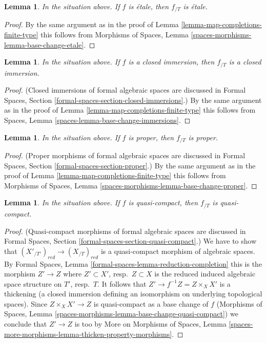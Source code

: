 \documentclass{stacks-project}
\theoremstyle{plain}
\newtheorem{lemma}[subsection]{Lemma}
\theoremstyle{definition}
\theoremstyle{remark}
\numberwithin{equation}{subsection}
\begin{document}
\begin{lemma}
\label{lemma-map-completions-etale}
In the situation above. If $f$ is \'etale, then $f_{/T}$ is \'etale.
\end{lemma}

\begin{proof}
By the same argument as in the proof of
Lemma \ref{lemma-map-completions-finite-type} this follows from
Morphisms of Spaces, Lemma \ref{spaces-morphisms-lemma-base-change-etale}.
\end{proof}

\begin{lemma}
\label{lemma-closed-immersion-gives-closed-immersion}
In the situation above. If $f$ is a closed immersion, then
$f_{/T}$ is a closed immersion.
\end{lemma}

\begin{proof}
(Closed immersions of formal algebraic spaces are discussed in
Formal Spaces, Section
\ref{formal-spaces-section-closed-immersions}.)
By the same argument as in the proof of
Lemma \ref{lemma-map-completions-finite-type} this follows from
Spaces, Lemma
\ref{spaces-lemma-base-change-immersions}.
\end{proof}

\begin{lemma}
\label{lemma-proper-gives-proper}
In the situation above. If $f$ is proper, then $f_{/T}$ is proper.
\end{lemma}

\begin{proof}
(Proper morphisms of formal algebraic spaces are discussed in
Formal Spaces, Section \ref{formal-spaces-section-proper}.)
By the same argument as in the proof of
Lemma \ref{lemma-map-completions-finite-type} this follows from
Morphisms of Spaces, Lemma
\ref{spaces-morphisms-lemma-base-change-proper}.
\end{proof}

\begin{lemma}
\label{lemma-quasi-compact-gives-quasi-compact}
In the situation above. If $f$ is quasi-compact, then
$f_{/T}$ is quasi-compact.
\end{lemma}

\begin{proof}
(Quasi-compact morphisms of formal algebraic spaces are discussed in
Formal Spaces, Section \ref{formal-spaces-section-quasi-compact}.)
We have to show that $(X'_{/T'})_{red} \to (X_{/T})_{red}$ is a quasi-compact
morphism of algebraic spaces. By
Formal Spaces, Lemma \ref{formal-spaces-lemma-reduction-completion}
this is the morphism $Z' \to Z$ where $Z' \subset X'$, resp.\ $Z \subset X$
is the reduced induced algebraic space structure on $T'$, resp.\ $T$.
It follows that $Z' \to f^{-1}Z = Z \times_X X'$ is a thickening (a closed
immersion defining an isomorphism on underlying topological spaces).
Since $Z \times_X X' \to Z$ is quasi-compact as a base change of $f$
(Morphisms of Spaces, Lemma
\ref{spaces-morphisms-lemma-base-change-quasi-compact})
we conclude that $Z' \to Z$ is too by
More on Morphisms of Spaces, Lemma
\ref{spaces-more-morphisms-lemma-thicken-property-morphisms}.
\end{proof}
\end{document}
